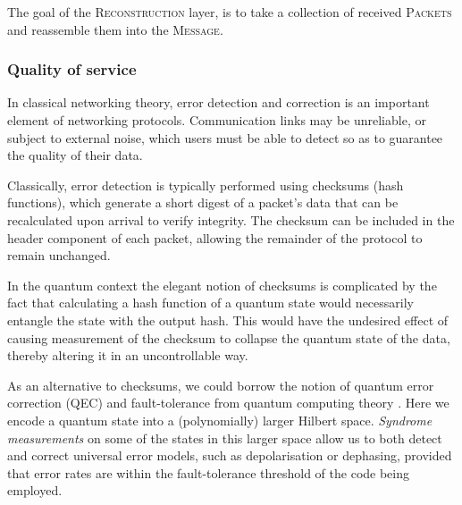 \begin{table}[!htb]
\caption{The goal of the \textsc{Reconstruction} layer, is to take a collection of received \textsc{Packets} and reassemble them into the \textsc{Message}.} \label{alg:reconstruction}
\end{table}

%
%

\subsubsection{Quality of service} \label{sec:QOS} 

In classical networking theory, error detection and correction is an important element of networking protocols. Communication links may be unreliable, or subject to external noise, which users must be able to detect so as to guarantee the quality of their data.

Classically, error detection is typically performed using checksums (hash functions), which generate a short digest of a packet's data that can be recalculated upon arrival to verify integrity. The checksum can be included in the header component of each packet, allowing the remainder of the protocol to remain unchanged.

In the quantum context the elegant notion of checksums is complicated by the fact that calculating a hash function of a quantum state would necessarily entangle the state with the output hash. This would have the undesired effect of causing measurement of the checksum to collapse the quantum state of the data, thereby altering it in an uncontrollable way.

As an alternative to checksums, we could borrow the notion of quantum error correction (QEC) and fault-tolerance from quantum computing theory \cite{???}. Here we encode a quantum state into a (polynomially) larger Hilbert space. \textit{Syndrome measurements} on some of the states in this larger space allow us to both detect and correct universal error models, such as depolarisation or dephasing, provided that error rates are within the fault-tolerance threshold of the code being employed.

